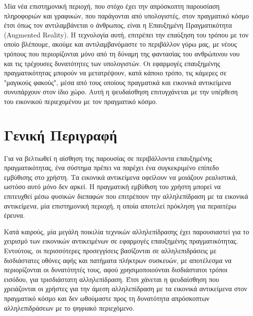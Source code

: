 

 \label{c:intro}

Μία νέα επιστημονική περιοχή, που στόχο έχει την απρόσκοπτη παρουσίαση πληροφοριών και γραφικών, που παράγονται από υπολογιστές, στον πραγματικό κόσμο έτσι όπως τον αντιλαμβάνεται ο άνθρωπος, είναι η Επαυξημένη Πραγματικότητα (Augmented Reality). 
Η τεχνολογία αυτή, επιτρέπει την επαύξηση του τρόπου με τον οποίο βλέπουμε, ακούμε και αντιλαμβανόμαστε το περιβάλλον γύρω μας, με νέους τρόπους που περιορίζονται μόνο από τη δύναμη της φαντασίας του ανθρώπινου νου και τις τρέχουσες δυνατότητες των υπολογιστών. Οι εφαρμογές επαυξημένης πραγματικότητας μπορούν να μετατρέψουν, κατά κάποιο τρόπο, τις κάμερες σε "μαγικούς φακούς", μέσα από τους οποίους πραγματικά και εικονικά αντικείμενα συνυπάρχουν στον ίδιο χώρο. Αυτή η ψευδαίσθηση επιτυγχάνεται με την υπέρθεση του εικονικού περιεχομένου με τον πραγματικό κόσμο. 


\section{Γενική Περιγραφή}


Για να βελτιωθεί η αίσθηση της παρουσίας σε περιβάλλοντα επαυξημένης πραγματικότητας, ένα σύστημα πρέπει να παρέχει ένα συγκεκριμένο επίπεδο εμβύθισης στο χρήστη. Τα εικονικά αντικείμενα οφείλουν να μοιάζουν ρεαλιστικά, ωστόσο αυτό μόνο δεν αρκεί. Η πραγματική εμβύθιση του χρήστη μπορεί να επιτευχθεί μέσω φυσικών διεπαφών που επιτρέπουν την αλληλεπίδραση με τα εικονικά αντικείμενα, μία επιστημονική περιοχή, η οποία αποτελεί πρόκληση για περαιτέρω έρευνα.

Κατά καιρούς, μία μεγάλη ποικιλία τεχνικών αλληλεπίδρασης έχει παρουσιαστεί για το χειρισμό των εικονικών αντικειμένων σε εφαρμογές επαυξημένης πραγματικότητας. Εντούτοις, οι περισσότερες προσεγγίσεις βασίζονται σε αλληλεπιδράσεις με δισδιάστατες οθόνες αφής και πατήματα πλήκτρων συσκευών, με αποτέλεσμα να περιορίζονται οι δυνατότητές τους, αφού χρησιμοποιούνται δισδιάστατοι τρόποι εισόδου, για τρισδιάστατη αλληλεπίδραση. Έτσι χάνεται η ψευδαίσθηση που χρειάζονται οι χρήστες για την άμεση αλληλεπίδραση με τα εικονικά αντικείμενα στον πραγματικό κόσμο και δεν ωθούμαστε προς τη δυνατότητα απρόσκοπτων αλληλεπιδράσεων με το ψηφιακό περιεχόμενο.


